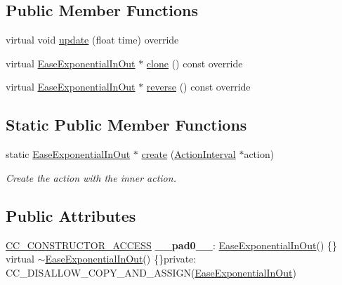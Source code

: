 \subsection*{Public Member Functions}
\begin{DoxyCompactItemize}
\item 
virtual void \hyperlink{classEaseExponentialInOut_a856f7d0224d0ae8055b4a91a1538ce73}{update} (float time) override
\item 
virtual \hyperlink{classEaseExponentialInOut}{Ease\+Exponential\+In\+Out} $\ast$ \hyperlink{classEaseExponentialInOut_a04bfa04ce8c396bdd5d058cfc771b9cb}{clone} () const override
\item 
virtual \hyperlink{classEaseExponentialInOut}{Ease\+Exponential\+In\+Out} $\ast$ \hyperlink{classEaseExponentialInOut_a48f34b3525dacd953bd9dbd014e93356}{reverse} () const override
\end{DoxyCompactItemize}
\subsection*{Static Public Member Functions}
\begin{DoxyCompactItemize}
\item 
static \hyperlink{classEaseExponentialInOut}{Ease\+Exponential\+In\+Out} $\ast$ \hyperlink{classEaseExponentialInOut_ad8a47b8472e752b8aeae8faa290a0f1f}{create} (\hyperlink{classActionInterval}{Action\+Interval} $\ast$action)
\begin{DoxyCompactList}\small\item\em Create the action with the inner action. \end{DoxyCompactList}\end{DoxyCompactItemize}
\subsection*{Public Attributes}
\begin{DoxyCompactItemize}
\item 
\mbox{\label{classEaseExponentialInOut_a75cfc712bfa92f70659a9723f00f2b79}} 
\hyperlink{_2cocos2d_2cocos_2base_2ccConfig_8h_a25ef1314f97c35a2ed3d029b0ead6da0}{C\+C\+\_\+\+C\+O\+N\+S\+T\+R\+U\+C\+T\+O\+R\+\_\+\+A\+C\+C\+E\+SS} {\bfseries \+\_\+\+\_\+pad0\+\_\+\+\_\+}\+: \hyperlink{classEaseExponentialInOut}{Ease\+Exponential\+In\+Out}() \{\} virtual $\sim$\hyperlink{classEaseExponentialInOut}{Ease\+Exponential\+In\+Out}() \{\}private\+: C\+C\+\_\+\+D\+I\+S\+A\+L\+L\+O\+W\+\_\+\+C\+O\+P\+Y\+\_\+\+A\+N\+D\+\_\+\+A\+S\+S\+I\+GN(\hyperlink{classEaseExponentialInOut}{Ease\+Exponential\+In\+Out})
\end{DoxyCompactItemize}
